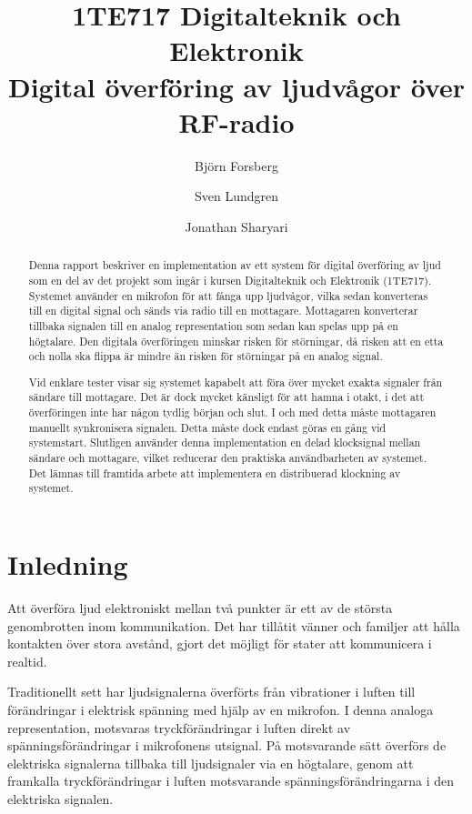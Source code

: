 \documentclass[a4paper,10pt]{article}
\title{1TE717 Digitalteknik och Elektronik \\ \textbf{Digital överföring av ljudvågor över RF-radio}}
\author{Bj{\"o}rn Forsberg \and Sven Lundgren \and Jonathan Sharyari}
\begin{document}
\maketitle

\begin{abstract}

Denna rapport beskriver en implementation av ett system för digital 
överföring av ljud som en del av det projekt som ingår i kursen Digitalteknik och Elektronik 
(1TE717). Systemet använder en mikrofon för att fånga upp ljudvågor, vilka sedan
konverteras till en digital signal och sänds via radio till en mottagare.
Mottagaren konverterar tillbaka signalen till en analog representation som
sedan kan spelas upp på en högtalare. Den digitala överföringen minskar risken
för störningar, då risken att en etta och nolla ska flippa är 
mindre än risken för störningar på en analog signal.

Vid enklare tester visar sig systemet kapabelt att föra över mycket exakta 
signaler från sändare till mottagare. Det är dock mycket känsligt för att hamna
i otakt, i det att överföringen inte har någon tydlig början och slut. I och med
detta måste mottagaren manuellt synkronisera signalen. Detta måste dock endast
göras en gång vid systemstart. Slutligen använder denna implementation en delad
klocksignal mellan sändare och mottagare, vilket reducerar den praktiska 
användbarheten av systemet. Det lämnas till framtida arbete att implementera en
distribuerad klockning av systemet.
\end{abstract}

\section{Inledning}

Att överföra ljud elektroniskt mellan två punkter är ett av de största 
genombrotten inom kommunikation. Det har tillåtit vänner och familjer  att hålla 
kontakten över stora avstånd, gjort det möjligt för stater att kommunicera i realtid.

Traditionellt sett har ljudsignalerna överförts från vibrationer i luften till
förändringar i elektrisk spänning med hjälp av en mikrofon. I denna analoga 
representation, motsvaras tryckförändringar i luften direkt av 
spänningsförändringar i mikrofonens utsignal. På motsvarande sätt överförs de
elektriska signalerna tillbaka till ljudsignaler via en högtalare, genom att 
framkalla tryckförändringar i luften motsvarande spänningsförändringarna i
den elektriska signalen.
\end{document}
